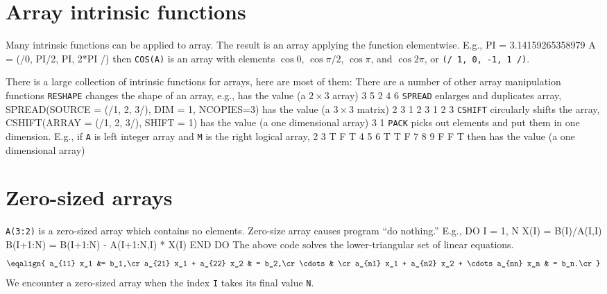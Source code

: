 {\section{Array intrinsic functions}
Many intrinsic functions can be applied to array.  The result is an
array applying the function elementwise. E.g.,
\ttbg
PI = 3.14159265358979
A = (/0, PI/2, PI, 2*PI /)
\tted
then {\tt COS(A)} is an array with elements $\cos 0$, $\cos \pi/2$,
$\cos\pi$, and $\cos 2\pi$, or {\tt (/ 1, 0, -1, 1 /)}.

There is a large collection of intrinsic functions for arrays, 
here are most of them:
\sms
{}
\sms
There are a number of other array manipulation functions
{\tt RESHAPE} changes the shape of an array, e.g.,
\sms
{}
\sms
has the value (a $2\times 3$ array)
  3  5
2  4  6
\tted
{\tt SPREAD} enlarges and duplicates array,
\ttbg
SPREAD(SOURCE = (/1, 2, 3/), DIM = 1, NCOPIES=3)
\tted
has the value (a $3\times 3$ matrix)
  2  3
1  2  3
1  2  3
\tted
{\tt CSHIFT} circularly shifts the array, 
\ttbg
CSHIFT(ARRAY = (/1, 2, 3/), SHIFT = 1)
\tted
has the value (a one dimensional array)
  3  1
\tted
{\tt PACK} picks out elements and put them in one dimension. E.g., if
{\tt A} is left integer array and {\tt M} is the right logical array,
  2  3              T  F  T
4  5  6              T  T  F
7  8  9              F  F  T
\tted
then 
\sms
{}
\sms
has the value (a one dimensional array)
\sms
{}
\sms

\section{Zero-sized arrays}
{\tt A(3:2)} is a zero-sized array which contains no elements.  Zero-size
array causes program ``do nothing.''  E.g.,
\ttbg
DO I = 1, N
   X(I) = B(I)/A(I,I)
   B(I+1:N) = B(I+1:N) - A(I+1:N,I) * X(I)
END DO
\tted
The above code solves the lower-triangular set of linear equations.
$$\eqalign{
a_{11} x_1 &= b_1,\cr
a_{21} x_1 + a_{22} x_2 & = b_2,\cr
\cdots  & \cr
a_{n1} x_1 + a_{n2} x_2  + \cdots a_{nn} x_n & = b_n.\cr
}$$
We encounter a zero-sized array when the index {\tt I} takes its final
value {\tt N}.

}
